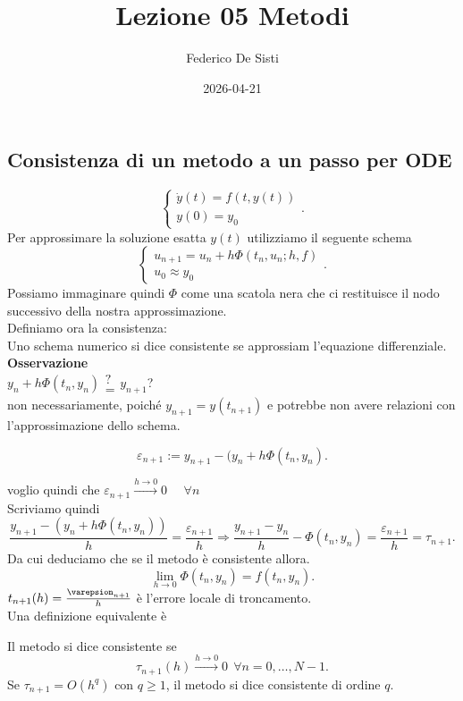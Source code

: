 \documentclass[12px]{article}
\title{Lezione 05 Metodi}
\date{2026-04-21}
\author{Federico De Sisti}
\begin{document}
	\maketitle
	\newpage
	\subsection{Consistenza di un metodo a un passo per ODE}
	\[
	\begin{cases}
		\dot y(t) = f(t,y(t))\\
		y(0) = y_0
	\end{cases}
	.\] 
	Per approssimare la soluzione esatta $y(t)$ utilizziamo il seguente schema
	\[
	\begin{cases}
		u_{n+1} = u_n +h \Phi(t_n, u_n; h,f)\\
		u_0 \approx y_0
	\end{cases}
	.\] 
	Possiamo immaginare quindi $\Phi$ come una scatola nera che ci restituisce il nodo successivo della nostra approssimazione.\\
	Definiamo ora la consistenza:\\
	Uno schema numerico si dice consistente se approssiam l'equazione differenziale.\\
	\textbf{Osservazione}\\
	$y_n + h\Phi(t_n,y_n)\substack{?\\=}y_{n+1}$?\\
	non necessariamente, poiché  $y_{n+1} = y(t_{n+1})$ e potrebbe non avere relazioni con l'approssimazione dello schema.\\
	\begin{defi}[Residuo]
	\[\varepsilon_{n+1} := y_{n+1} - (y_n + h\Phi(t_n,y_n).\]
	\end{defi}
	voglio quindi che $\varepsilon_{n+1} \xrightarrow{h \rightarrow 0}0$ \ \ $\forall n$\\
	Scriviamo quindi
	 \[
		 \frac{y_{n+1}-(y_n + h \Phi(t_n,y_n))}h= \frac{\varepsilon_{n+1}}{h} \Rightarrow \frac{y_{n+1}-y_n}{h} - \Phi(t_n,y_n) = \frac{\varepsilon_{n+1}}h = \tau_{n+1}
	.\] 
Da cui deduciamo che se il metodo è consistente allora.
\[
	\lim_{h \rightarrow 0 }\Phi(t_n,y_n) = f(t_n,y_n)
.\] 
$t_{n+1}(h) = \frac{\varepsion_{n+1}}h$ è l'errore locale di troncamento.\\
Una definizione equivalente è
 \begin{defi}
	Il metodo si dice consistente se 
	\[
		\tau_{n+1}(h) \xrightarrow{h \rightarrow 0} 0 \ \ \forall n = 0,\ldots, N-1
	.\]  
	Se $\tau_{n+1} = O(h^q)$ con  $q\geq 1$, il metodo si dice consistente di ordine  $q$.
\end{defi}
\end{document}
